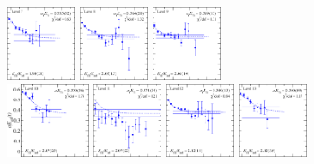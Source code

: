 \begin{figure}[H]
    \includegraphics[width=0.18\textwidth]{figures/sigmas/g1g/fits/fit_19.pdf}
    \includegraphics[width=0.18\textwidth]{figures/sigmas/g1g/fits/fit_14.pdf}
    \includegraphics[width=0.18\textwidth]{figures/sigmas/g1g/fits/fit_6.pdf}\\
    \includegraphics[width=0.215\textwidth]{figures/sigmas/g1g/fits/fit_23.pdf}
    \includegraphics[width=0.18\textwidth]{figures/sigmas/g1g/fits/fit_1.pdf}
    \includegraphics[width=0.18\textwidth]{figures/sigmas/g1g/fits/fit_13.pdf}
    \includegraphics[width=0.18\textwidth]{figures/sigmas/g1g/fits/fit_22.pdf}

\end{figure}
